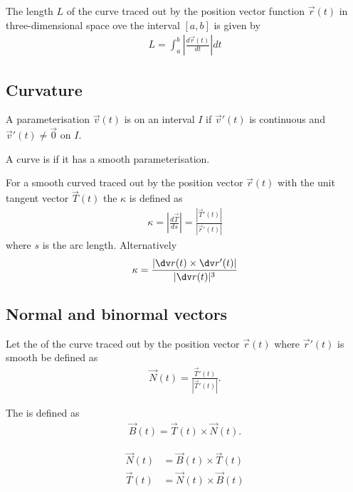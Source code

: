 \documentclass{article}
\begin{document}
\begin{theorem}
    The length $L$ of the curve traced out by the position vector function $\vec r(t)$ in three-dimensional space ove the interval
    $[a,b]$ is given by
    \begin{align*}
        L = \int_a^b \left|\frac{d\vec r(t)}{dt}\right| dt
    \end{align*}
\end{theorem}


\subsection{Curvature}


\begin{definition}
    A parameterisation $\vec v(t)$ is  on an interval $I$ if $\vec v'(t)$ is continuous and $\vec v'(t) \not = \vec 0$ on $I$.
\end{definition}
\begin{definition}
    A curve is  if it has a smooth parameterisation.
\end{definition}
\begin{definition}
    For a smooth curved traced out by the position vector $\vec r(t)$ with the unit tangent vector 
    $\vec T(t)$ the  $\kappa$ is defined as
    \begin{align*}
        \kappa = \left|\frac{d\vec T}{ds}\right|=\frac{\left| \vec T'(t)\right|}{\left|\vec r'(t)\right|}
    \end{align*}
    where $s$ is the arc length.
    Alternatively
    \begin{align*}
        \kappa = \frac{\left|\dv r(t) \times \dv r'(t)\right|}{|\dv r(t)|^3}
    \end{align*}
\end{definition}


\subsection{Normal and binormal vectors}


\begin{definition}
    Let the  of the curve traced out by the position vector $\vec r(t)$
    where $\vec r'(t)$ is smooth be defined as
    \begin{align*}
        \vec N (t) = \frac{\vec T'(t)}{\left| \vec T'(t) \right|}.
    \end{align*}
\end{definition}
\begin{definition}
    The  is defined as
    \begin{align*}
        \vec B(t) = \vec T(t) \times \vec N(t).
    \end{align*}
\end{definition}
\begin{theorem}
    \begin{align*}
        \vec N(t) &= \vec B(t) \times \vec T(t)\\
        \vec T(t) &= \vec N(t) \times \vec B(t)
    \end{align*}
\end{theorem}
\end{document}
